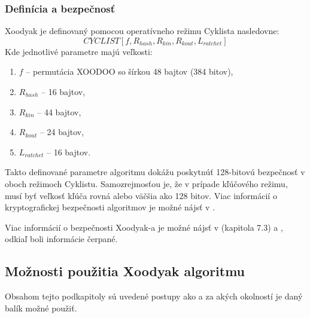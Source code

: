 \subsubsection{Definícia a bezpečnosť}
Xoodyak je definovaný pomocou operatívneho režimu Cyklista nasledovne:
\begin{equation}
	CYCLIST[f,R_{hash},R_{kin},R_{kout},L_{ratchet}]
\end{equation} 
Kde jednotlivé parametre majú veľkosti:
\begin{enumerate}
	\item $f$ -- permutácia XOODOO so šírkou 48 bajtov (384 bitov),
	\item $R_{hash}$ -- 16 bajtov,
	\item $R_{kin}$ -- 44 bajtov,
	\item $R_{kout}$ -- 24 bajtov,
	\item $L_{ratchet}$ -- 16 bajtov.  
\end{enumerate}
Takto definované parametre algoritmu dokážu poskytnúť 128-bitovú bezpečnosť v oboch režimoch Cyklistu. Samozrejmosťou je, že v prípade kľúčového režimu, musí byť veľkosť kľúča rovná alebo väčšia ako 128 bitov. Viac informácií o kryptografickej bezpečnosti algoritmov je možné nájsť v \cite{sec}.

Viac informácií o bezpečnosti Xoodyak-a je možné nájsť v \cite{xcb} (kapitola 7.3) a \cite{xdr2}, odkiaľ boli informácie čerpané.

\subsection{Možnosti použitia Xoodyak algoritmu}
Obsahom tejto podkapitoly sú uvedené postupy ako a za akých okolností je daný balík možné použiť. 
